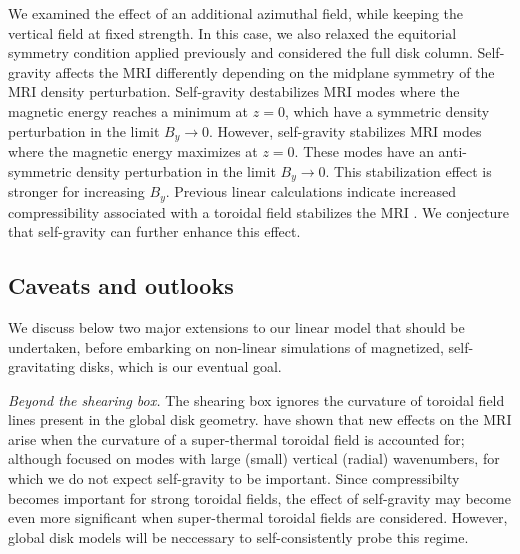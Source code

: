 
We examined the effect of an additional azimuthal field, while
keeping the vertical field at fixed strength. In this case, we also
relaxed the equitorial symmetry condition applied previously and
considered the full disk column. Self-gravity affects the MRI
differently depending on the midplane symmetry of the MRI density
perturbation. Self-gravity destabilizes MRI modes where the magnetic
energy reaches a minimum at $z=0$, which have a symmetric
density perturbation in the limit $B_y\to0$. However, 
self-gravity stabilizes MRI modes where the magnetic energy maximizes
at $z=0$. These modes have an anti-symmetric density
perturbation in the limit $B_y\to0$. This stabilization effect is
stronger for increasing $B_y$. Previous linear calculations indicate
increased compressibility associated with a toroidal field stabilizes
the MRI \citep{kim03}. We conjecture that self-gravity can
further enhance this effect.   


\subsection{Caveats and outlooks}
We discuss below two major extensions to our linear model that
should be undertaken, before embarking on non-linear simulations of
magnetized, self-gravitating disks, which is our eventual goal.  

\emph{Beyond the shearing box.} The shearing box ignores the curvature
of toroidal field lines present in the global disk 
geometry. \cite{pessah05} have shown that new effects on the MRI arise
when the curvature of a super-thermal toroidal field is accounted for;
although \citeauthor{pessah05} focused on modes with large (small)
vertical (radial) wavenumbers, for which we do not expect self-gravity
to be important. Since compressibilty becomes important for strong
toroidal fields, the effect of self-gravity may become even more
significant when super-thermal toroidal fields are
considered. However, global disk models will be neccessary
to self-consistently probe this regime. 

